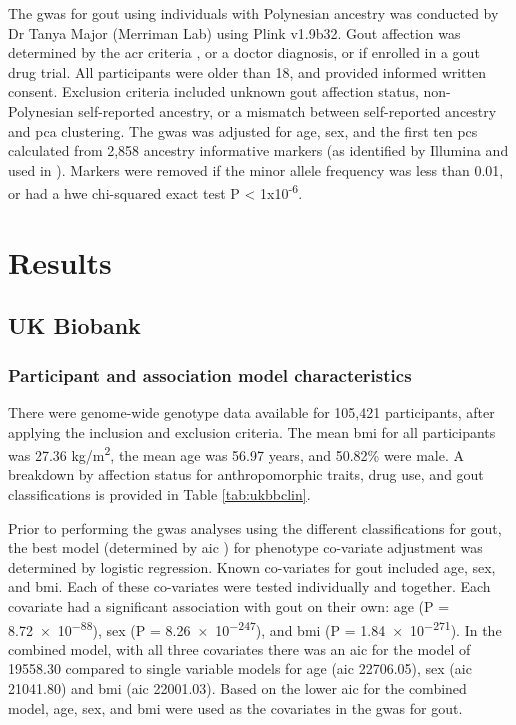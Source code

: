 \documentclass[twoside,openright]{report}
\begin{document}
The \gls{gwas} for gout using individuals with Polynesian ancestry was
conducted by Dr Tanya Major (Merriman Lab) using Plink v1.9b32. Gout
affection was determined by the \gls{acr} criteria \citep{Wallace1977a},
or a doctor diagnosis, or if enrolled in a gout drug trial. All
participants were older than 18, and provided informed written consent.
Exclusion criteria included unknown gout affection status,
non-Polynesian self-reported ancestry, or a mismatch between
self-reported ancestry and \gls{pca} clustering. The \gls{gwas} was
adjusted for age, sex, and the first ten \glspl{pc} calculated from
2,858 ancestry informative markers (as identified by Illumina and used
in \citet{Guo2014}). Markers were removed if the minor allele frequency
was less than 0.01, or had a \gls{hwe} chi-squared exact test P
\textless{} 1x10\textsuperscript{-6}.

\section{Results}\label{results-2}

\subsection{UK Biobank}\label{uk-biobank}

\subsubsection{Participant and association model
characteristics}\label{participant-and-association-model-characteristics}

There were genome-wide genotype data available for 105,421 participants,
after applying the inclusion and exclusion criteria. The mean \gls{bmi}
for all participants was 27.36 kg/m\textsuperscript{2}, the mean age was
56.97 years, and 50.82\% were male. A breakdown by affection status for
anthropomorphic traits, drug use, and gout classifications is provided
in Table \ref{tab:ukbbclin}.

Prior to performing the \gls{gwas} analyses using the different
classifications for gout, the best model (determined by \gls{aic}
\citep{Akaike1974}) for phenotype co-variate adjustment was determined
by logistic regression. Known co-variates for gout included age, sex,
and \gls{bmi}. Each of these co-variates were tested individually and
together. Each covariate had a significant association with gout on
their own: age (P = \num{8.72e-88}), sex (P = \num{8.26e-247}), and
\gls{bmi} (P = \num{1.84e-271}). In the combined model, with all three
covariates there was an \gls{aic} for the model of 19558.30 compared to
single variable models for age (\gls{aic} 22706.05), sex (\gls{aic}
21041.80) and \gls{bmi} (\gls{aic} 22001.03). Based on the lower
\gls{aic} for the combined model, age, sex, and \gls{bmi} were used as
the covariates in the \gls{gwas} for gout.
\end{document}
